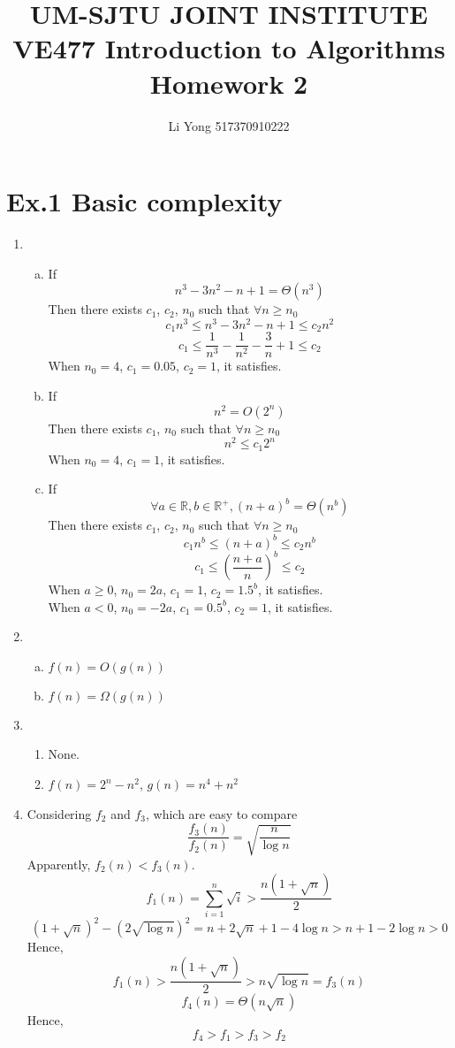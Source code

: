 \documentclass[a4paper]{article}
\title{UM-SJTU JOINT INSTITUTE\\VE477 Introduction to Algorithms\\\vspace{0.5cm} Homework 2}
\author{Li Yong 517370910222}
\begin{document}
\maketitle
\newpage

\section*{Ex.1 Basic complexity}
	\begin{enumerate}[1.]
		\item
		\begin{enumerate}[a)]
			\item If $$n^3-3n^2-n+1=\Theta(n^3)$$
			Then there exists $c_1$, $c_2$, $n_0$ such that $\forall n\geq n_0$
			$$c_1n^3\leq n^3-3n^2-n+1 \leq c_2n^2$$
			$$c_1\leq \frac{1}{n^3}-\frac{1}{n^2}-\frac{3}{n}+1 \leq c_2$$
			When $n_0 = 4$, $c_1 = 0.05$, $c_2 = 1$, it satisfies.
			\item If $$n^2 = O(2^n)$$
			Then there exists $c_1$, $n_0$ such that $\forall n\geq n_0$
			$$n^2 \leq c_1 2^n$$
			When $n_0 = 4$, $c_1 = 1$, it satisfies.
			\item If $$\forall a\in \mathbb{R}, b\in \mathbb{R^+}, (n+a)^b = \Theta(n^b)$$
			Then there exists $c_1$, $c_2$, $n_0$ such that $\forall n\geq n_0$
			$$c_1 n^b\leq (n+a)^b \leq c_2 n^b$$
			$$c_1\leq (\frac{n+a}{n})^b \leq c_2$$
			When $a \geq 0$, $n_0=2a$, $c_1 = 1$, $c_2=1.5^b$, it satisfies.\\
			When $a < 0$, $n_0=-2a$, $c_1 = 0.5^b$, $c_2=1$, it satisfies.
		\end{enumerate}
		\item
		\begin{enumerate}[a)]
			\item $f(n) = O(g(n))$
			\item $f(n) = \Omega(g(n))$
		\end{enumerate}
		\item
		\begin{enumerate}
			\item None.
			\item $f(n)=2^n-n^2$, $g(n)=n^4+n^2$
		\end{enumerate}
		\item
		Considering $f_2$ and $f_3$, which are easy to compare
		$$\frac{f_3(n)}{f_2(n)} = \sqrt{\frac{n}{\log{n}}}$$
		Apparently, $f_2(n)<f_3(n)$.
		$$f_1(n) = \sum_{i=1}^n\sqrt{i} > \frac{n(1+\sqrt{n})}{2}$$
		$$(1+\sqrt{n})^2 - (2\sqrt{\log{n}})^2 = n + 2\sqrt{n} + 1 - 4\log{n} > n + 1 - 2\log{n}>0$$
		Hence, $$f_1(n) > \frac{n(1+\sqrt{n})}{2} > n\sqrt{\log{n}} = f_3(n)$$
		$$f_4(n) = \Theta(n\sqrt{n})$$
		Hence, $$f_4>f_1>f_3>f_2$$
	\end{enumerate}
\end{document}

